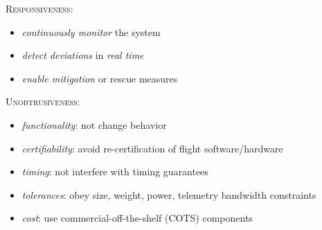 \documentclass[dvipsnames,svgnames]{beamer}
\begin{document}
\begin{frame}
\noindent\textsc{\textcolor{RedViolet}{ Responsiveness:}} 
\begin{itemize}
\item \emph{\textcolor{RedViolet}{continuously monitor}} the system
\item \emph{\textcolor{RedViolet}{detect deviations}} in \emph{real time}%
\item \emph{\textcolor{RedViolet}{enable mitigation}} or rescue measures
\end{itemize}
   
\noindent\textsc{\textcolor{RedViolet}{ Unobtrusiveness:}}
\noindent
\begin{itemize}
\item \emph{\textcolor{RedViolet}{functionality}}: not change behavior
\item \emph{\textcolor{RedViolet}{certifiability}}: avoid re-certification of flight software/hardware %
\item \emph{\textcolor{RedViolet}{timing}}: not interfere with timing guarantees
\item \emph{\textcolor{RedViolet}{tolerances}}: obey size, weight, power, telemetry bandwidth constraints
\item \emph{\textcolor{RedViolet}{cost}}: use commercial-off-the-shelf (COTS) components
\end{itemize}

\end{frame}
\end{document}
